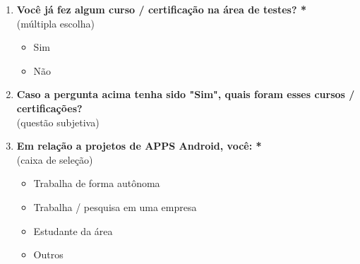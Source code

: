 \begin{enumerate}[label=\bf A\arabic*,leftmargin=1.8cm]
\begin{enumerate}[label= \arabic*]
        \item \textbf{Você já fez algum curso / certificação na área de testes? *}\\
        (múltipla escolha)
        \begin{itemize}
            \item Sim
            \item Não
        \end{itemize}
        
        \item \textbf{Caso a pergunta acima tenha sido "Sim", quais foram esses cursos / certificações?}\\
        (questão subjetiva)
        
        \item \textbf{Em relação a projetos de \ac{APPS} Android, você: *}\\
        (caixa de seleção)
        \begin{itemize}
            \item Trabalha de forma autônoma
            \item Trabalha / pesquisa em uma empresa
            \item Estudante da área
            \item Outros
        \end{itemize}


\end{enumerate}
\end{enumerate}
